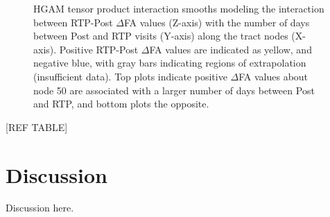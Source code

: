 \documentclass[12pt]{article}
\begin{document}
\begin{figure}[H]
	\centering
	\caption{HGAM tensor product interaction smooths modeling the interaction between RTP-Post $\Delta$FA values (Z-axis) with the number of days between Post and RTP visits (Y-axis) along the tract nodes (X-axis). Positive RTP-Post $\Delta$FA values are indicated as yellow, and negative blue, with gray bars indicating regions of extrapolation (insufficient data). Top plots indicate positive $\Delta$FA values about node 50 are associated with a larger number of days between Post and RTP, and bottom plots the opposite.}
	\label{fig:di-time}
\end{figure}

[REF TABLE]


\section{Discussion}
\label{sec:disc}
Discussion here.

\end{document}
